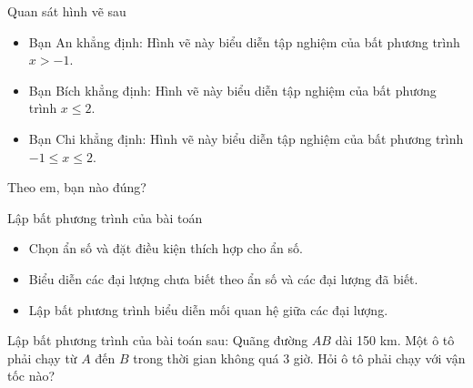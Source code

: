 \begin{vd}%
	Quan sát hình vẽ sau
	\begin{center}
	\end{center}
	\begin{itemize}
		\item Bạn An khẳng định: Hình vẽ này biểu diễn tập nghiệm của bất phương trình $x>-1$.
		\item Bạn Bích khẳng định: Hình vẽ này biểu diễn tập nghiệm của bất phương trình $x\leq 2$.
		\item Bạn Chi khẳng định: Hình vẽ này biểu diễn tập nghiệm của bất phương trình\\ $-1\leq  x\leq 2$.
	\end{itemize}
Theo em, bạn nào đúng?
\end{vd}
\begin{dang}{Lập bất phương trình của bài toán}
	\begin{itemize}
		\item Chọn ẩn số và đặt điều kiện thích hợp cho ẩn số.
		\item Biểu diễn các đại lượng chưa biết theo ẩn số và các đại lượng đã biết.
		\item Lập bất phương trình biểu diễn mối quan hệ giữa các đại lượng.
	\end{itemize}\end{dang}
\begin{vd}%
	Lập bất phương trình của bài toán sau: Quãng đường $AB$ dài 150 km. Một ô tô phải chạy từ $A$ đến $B$ trong thời gian không quá 3 giờ. Hỏi ô tô phải chạy với vận tốc nào?
\end{vd}
